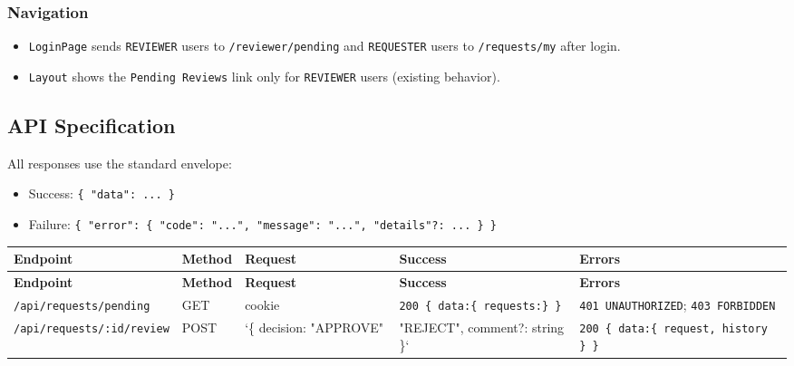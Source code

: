 \documentclass[11pt,a4paper]{article}
\begin{document}
\subsubsection{Navigation}

\begin{itemize}[leftmargin=*,itemsep=2pt,topsep=2pt]
  \item \texttt{LoginPage} sends \texttt{REVIEWER} users to \texttt{/reviewer/pending} and \texttt{REQUESTER} users to \texttt{/requests/my} after login.
  \item \texttt{Layout} shows the \texttt{Pending Reviews} link only for \texttt{REVIEWER} users (existing behavior).
\end{itemize}

\subsection{API Specification}

All responses use the standard envelope:\\
\begin{itemize}[leftmargin=*,itemsep=2pt,topsep=2pt]
  \item Success: \texttt{\{ "data": ... \}}
  \item Failure: \texttt{\{ "error": \{ "code": "...", "message": "...", "details"?: ... \} \}}
\end{itemize}
\vspace{0.3em}
\begin{longtable}{|>{\RaggedRight}p{3.5cm}|>{\centering\arraybackslash}p{1.4cm}|>{\RaggedRight}p{2.2cm}|>{\RaggedRight}p{5.2cm}|>{\RaggedRight}p{3.5cm}|}
\hline
\rowcolor{zenPale}\textbf{Endpoint} & \textbf{Method} & \textbf{Request} & \textbf{Success} & \textbf{Errors} \\ \hline
\endfirsthead
\hline
\rowcolor{zenPale}\textbf{Endpoint} & \textbf{Method} & \textbf{Request} & \textbf{Success} & \textbf{Errors} \\ \hline
\endhead
\hline
\endfoot
\texttt{/\allowbreak api/\allowbreak requests/\allowbreak pending} & GET & cookie & \texttt{200 \{ data:\allowbreak  \{ requests: \} \}} & \texttt{401 UNAUTHORIZED}; \texttt{403 FORBIDDEN} \\ \hline
\texttt{/\allowbreak api/\allowbreak requests/\allowbreak :\allowbreak id/\allowbreak review} & POST & `\{ decision: "APPROVE" \ & "REJECT", comment?: string \}` & \texttt{200 \{ data:\allowbreak  \{ request, history \} \}} \\ \hline
\end{longtable}
\vspace{0.3em}
\end{document}
